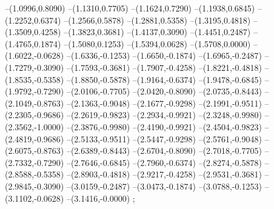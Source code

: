 {--(1.0996,0.8090)
--(1.1310,0.7705)
--(1.1624,0.7290)
--(1.1938,0.6845)
--(1.2252,0.6374)
--(1.2566,0.5878)
--(1.2881,0.5358)
--(1.3195,0.4818)
--(1.3509,0.4258)
--(1.3823,0.3681)
--(1.4137,0.3090)
--(1.4451,0.2487)
--(1.4765,0.1874)
--(1.5080,0.1253)
--(1.5394,0.0628)
--(1.5708,0.0000)
--(1.6022,-0.0628)
--(1.6336,-0.1253)
--(1.6650,-0.1874)
--(1.6965,-0.2487)
--(1.7279,-0.3090)
--(1.7593,-0.3681)
--(1.7907,-0.4258)
--(1.8221,-0.4818)
--(1.8535,-0.5358)
--(1.8850,-0.5878)
--(1.9164,-0.6374)
--(1.9478,-0.6845)
--(1.9792,-0.7290)
--(2.0106,-0.7705)
--(2.0420,-0.8090)
--(2.0735,-0.8443)
--(2.1049,-0.8763)
--(2.1363,-0.9048)
--(2.1677,-0.9298)
--(2.1991,-0.9511)
--(2.2305,-0.9686)
--(2.2619,-0.9823)
--(2.2934,-0.9921)
--(2.3248,-0.9980)
--(2.3562,-1.0000)
--(2.3876,-0.9980)
--(2.4190,-0.9921)
--(2.4504,-0.9823)
--(2.4819,-0.9686)
--(2.5133,-0.9511)
--(2.5447,-0.9298)
--(2.5761,-0.9048)
--(2.6075,-0.8763)
--(2.6389,-0.8443)
--(2.6704,-0.8090)
--(2.7018,-0.7705)
--(2.7332,-0.7290)
--(2.7646,-0.6845)
--(2.7960,-0.6374)
--(2.8274,-0.5878)
--(2.8588,-0.5358)
--(2.8903,-0.4818)
--(2.9217,-0.4258)
--(2.9531,-0.3681)
--(2.9845,-0.3090)
--(3.0159,-0.2487)
--(3.0473,-0.1874)
--(3.0788,-0.1253)
--(3.1102,-0.0628)
--(3.1416,-0.0000)
;}
